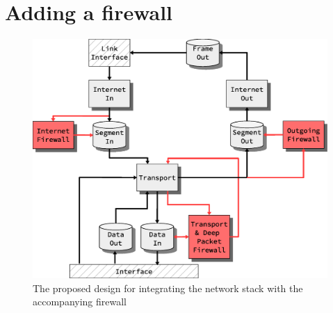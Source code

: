 \section{Adding a firewall}
\begin{figure}
\centering
\includegraphics[width=\linewidth]{future_work/firewall_integration_design.eps}
\caption{The proposed design for integrating the network stack with the
accompanying firewall}
\label{fig:firewall_integration_design}
\end{figure}


